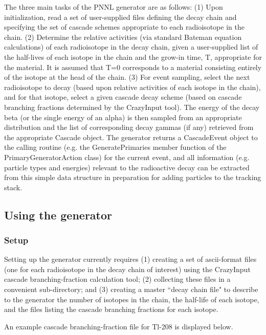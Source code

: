  The three main tasks of the PNNL generator are as follows: (1) Upon 
initialization, read a set of user-{}supplied files defining the decay chain and
specifying the set of cascade schemes appropriate to each radioisotope in the 
chain.  (2) Determine the relative activities (via standard Bateman equation 
calculations) of each radioisotope in the decay chain, given a user-{}supplied
list of the half-{}lives of each isotope in the chain and the grow-{}in time, T,
appropriate for the material.  It is assumed that T=0 corresponds to a material
consisting entirely of the isotope at the head of the chain.  (3) For event
sampling, select the next radioisotope to decay (based upon relative activities
of each isotope in the chain), and for that isotope, select a given cascade
decay scheme (based on cascade branching fractions determined by the CrazyInput
tool).  The energy of the decay beta (or the single energy of an alpha) is 
then sampled from an appropriate distribution and the list of corresponding
decay gammas (if any) retrieved from the appropriate Cascade object.  The 
generator returns a CascadeEvent object to the calling routine (e.g. the 
GeneratePrimaries member function of the PrimaryGeneratorAction class) for
the current event, and all information (e.g. particle types and energies) 
relevant to the radioactive decay can be extracted from this simple data 
structure in preparation for adding particles to the tracking stack.
 

\subsection{Using the generator}

\subsubsection{Setup}

 Setting up the generator currently requires (1) creating a set of ascii-{}format 
files (one for each radioisotope in the decay chain of interest) using the 
CrazyInput cascade branching-{}fraction calculation tool; (2) collecting these 
files in a convenient sub-{}directory; and (3) creating a master ``decay chain 
file" to describe to the generator the number of isotopes in the chain, the
half-{}life of each isotope, and the files listing the cascade branching
fractions for each isotope.
 

 An example cascade branching-{}fraction file for Tl-{}208 is displayed below.
 

